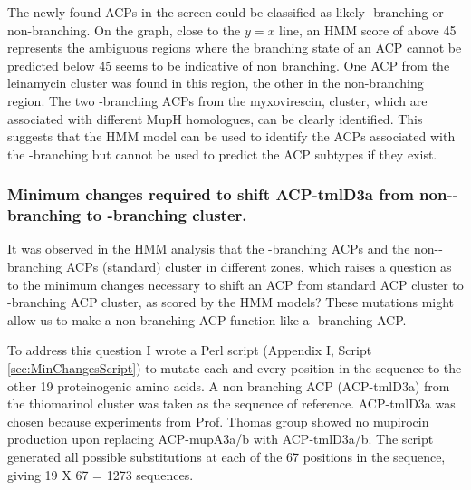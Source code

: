 	The newly found ACPs in the screen could be classified as likely \bet-branching or non-branching. On the graph, close to the $ y=x $ line, an HMM score of above 45 represents the ambiguous regions where the branching state of an ACP cannot be predicted below 45 seems to be indicative of non branching. One ACP from the leinamycin cluster was found in this region, the other in the non-branching region. The two \bet-branching ACPs from the myxovirescin, cluster, which are associated with different MupH homologues, can be clearly identified. This suggests that the HMM model can be used to identify the ACPs associated with the \bet-branching but cannot be used to predict the ACP subtypes if they exist.
			
		\subsubsection{Minimum changes required to shift ACP-tmlD3a from non-\bet-branching to \bet-branching cluster.}
		\label{sec:MinumChanges}
		It was observed in the HMM analysis that the \bet-branching ACPs and the non-\bet-branching ACPs (standard) cluster in different zones, which raises a question as to the minimum changes necessary to shift an ACP from standard ACP cluster to \bet-branching ACP cluster, as scored by the HMM models? These mutations might allow us to make a non-branching ACP function like a \bet-branching ACP.
				
		To address this question I wrote a Perl script (Appendix I, Script \ref{sec:MinChangesScript}) to mutate each and every position in the sequence to the other 19 proteinogenic amino acids. A non branching ACP (ACP-tmlD3a) from the thiomarinol cluster was taken as the sequence of reference. ACP-tmlD3a was chosen because experiments from Prof. Thomas group showed no mupirocin production upon replacing ACP-mupA3a/b with ACP-tmlD3a/b. The script generated all possible substitutions at each of the 67 positions in the sequence, giving 19 X 67  = 1273 sequences.
	
